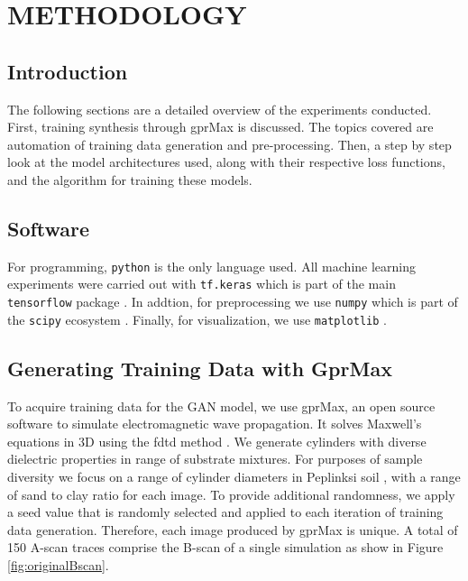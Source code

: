 \doublespacing
\chapter{METHODOLOGY}

\section{Introduction}
\hspace{0.5in}The following sections are a detailed overview of the experiments conducted. First, training synthesis through gprMax is discussed. The topics covered are automation of training data generation and pre-processing. Then, a step by step look at the model architectures used, along with their respective loss functions, and the algorithm for training these models.

\section{Software}
\hspace{0.5in}For programming, \lstinline{python} is the only language used. All machine learning experiments were carried out with \lstinline{tf.keras} which is part of the main \lstinline{tensorflow} package \cite{tensorflow}. In addtion, for preprocessing we use \lstinline{numpy} which is part of the \lstinline{scipy} ecosystem \cite{scipy}. Finally, for visualization, we use \lstinline{matplotlib} \cite{Hunter:2007}. 

\section{Generating Training Data with GprMax}
\hspace{0.5in}To acquire training data for the GAN model, we use gprMax, an open source software to simulate electromagnetic wave propagation. It solves Maxwell’s equations in 3D using the \acrfull{fdtd} method \cite{gprMax}. We generate cylinders with diverse dielectric properties in range of substrate mixtures. For purposes of sample diversity we focus on a range of cylinder diameters in Peplinksi soil \cite{peplinski}, with a range of sand to clay ratio for each image. To provide additional randomness, we apply a seed value that is randomly selected and applied to each iteration of training data generation. Therefore, each image produced by gprMax is unique. A total of 150 A-scan traces comprise the B-scan of a single simulation as show in Figure \ref{fig:originalBscan}. 
\vspace{0.5\baselineskip}

